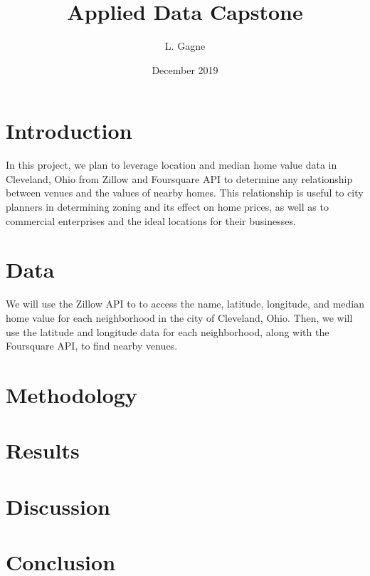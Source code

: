 \documentclass[twoside,12pt]{report}
\title{Applied Data Capstone}
\author{L. Gagne}
\date{December 2019}
\begin{document}
\maketitle

\chapter*{Introduction}


In this project, we plan to leverage location and median home value data in Cleveland, Ohio from Zillow and Foursquare API to determine any relationship between venues and the values of nearby homes.  This relationship is useful to city planners in determining zoning and its effect on home prices, as well as to commercial enterprises and the ideal locations for their businesses.

\chapter*{Data}

We will use the Zillow API to to access the name, latitude, longitude, and median home value for each neighborhood in the city of Cleveland, Ohio.  Then, we will use the latitude and longitude data for each neighborhood, along with the Foursquare API, to find nearby venues.

\chapter*{Methodology}



\chapter*{Results}

\chapter*{Discussion}

\chapter*{Conclusion}
\end{document}
